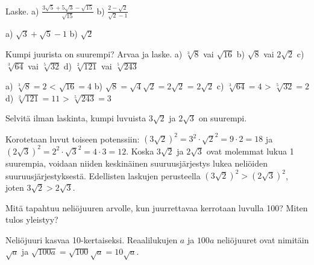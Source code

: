 \begin{tehtavasivu}
\begin{tehtava} Laske. 
a) $ \frac{3\sqrt{5}+5\sqrt{3}-\sqrt{15}}{\sqrt{15}}$  \quad b)  $ \frac{2-\sqrt{2}}{\sqrt{2}-1}$   \quad
\begin{vastaus}
a) $\sqrt{3}+\sqrt{5}-1$ \quad b) $\sqrt{2}$ \quad
\end{vastaus}
\end{tehtava}

\begin{tehtava} Kumpi juurista on suurempi? Arvaa ja laske.
a) $\sqrt[3]{8}$ vai $\sqrt{16}$ \quad b)  $\sqrt{8}$ vai $2\sqrt{2}$  \quad c) $\sqrt[3]{64}$ vai $\sqrt[5]{32}$ \quad d) $\sqrt[2]{121}$ vai $\sqrt[5]{243}$ 
\begin{vastaus}
a) $\sqrt[3]{8}=2$   <   $\sqrt{16}=4$ \quad b) $\sqrt{8}=\sqrt{4}\sqrt{2}=2\sqrt{2}$ \quad = \quad $2\sqrt{2}$ \quad c) $\sqrt[3]{64}=4$   >   $\sqrt[5]{32}=2$ \quad d) $\sqrt[2]{121}=11$ \quad  > \quad $\sqrt[5]{243}=3$ 
\end{vastaus}
\end{tehtava}


\begin{tehtava}
        Selvitä ilman laskinta, kumpi luvuista $3\sqrt{2}$ ja $2\sqrt{3}$ on suurempi. 
       
        \begin{vastaus}
        Korotetaan luvut toiseen potenssiin: $(3\sqrt{2})^2=3^2\cdot\sqrt{2}^2=9 \cdot 2=18$ ja $(2\sqrt{3})^2=2^2\cdot\sqrt{3}^2=4 \cdot 3=12$. Koska $3\sqrt{2}$ ja $2\sqrt{3}$ ovat molemmat lukua 1 suurempia, voidaan niiden keskinäinen suuruusjärjestys lukea neliöiden suuruusjärjestyksestä. Edellisten laskujen perusteella $(3\sqrt{2})^2 > (2\sqrt{3})^2$, joten $3\sqrt{2} > 2\sqrt{3}$.
        \end{vastaus}
\end{tehtava}

\begin{tehtava}
        Mitä tapahtuu neliöjuuren arvolle, kun juurrettavaa kerrotaan luvulla 100? Miten tulos yleistyy?
       
        \begin{vastaus}
        Neliöjuuri kasvaa 10-kertaiseksi. Reaalilukujen $a$ ja $100a$ neliöjuuret ovat nimitäin $\sqrt{a}$ ja $\sqrt{100a}=\sqrt{100}\sqrt{a}=10\sqrt{a}$.
        

\end{vastaus}
\end{tehtava}
\end{tehtavasivu}
